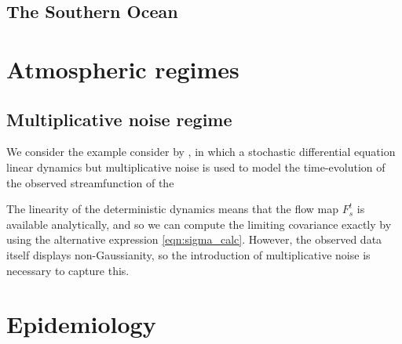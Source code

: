 \subsection{The Southern Ocean}

\section{Atmospheric regimes}


\subsection{Multiplicative noise regime}


We consider the example consider by \citet{SuraEtAl_2005_MultiplicativeNoiseNonGaussianity}, in which a stochastic differential equation linear dynamics but multiplicative noise is used to model the time-evolution of the observed streamfunction of the

The linearity of the deterministic dynamics means that the flow map \(F_s^t\) is available analytically, and so we can compute the limiting covariance exactly by using the alternative expression \eqref{eqn:sigma_calc}.
However, the observed data itself displays non-Gaussianity, so the introduction of multiplicative noise is necessary to capture this.




\section{Epidemiology}
